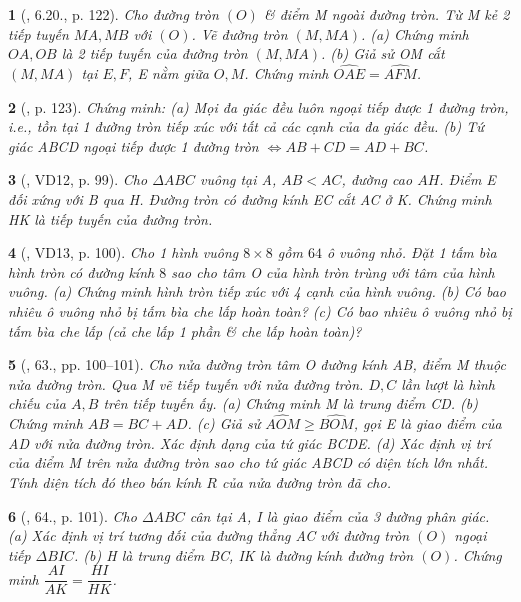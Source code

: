 \documentclass{article}
\newtheorem{baitoan}{}
\begin{document}
\begin{baitoan}[\cite{Binh_boi_duong_Toan_9_tap_1}, 6.20., p. 122]
	Cho đường tròn $(O)$ \& điểm M ngoài đường tròn. Từ M kẻ 2 tiếp tuyến $MA,MB$ với $(O)$. Vẽ đường tròn $(M,MA)$. (a) Chứng minh $OA,OB$ là 2 tiếp tuyến của đường tròn $(M,MA)$. (b) Giả sử OM cắt $(M,MA)$ tại $E,F$, E nằm giữa $O,M$. Chứng minh $\widehat{OAE} = \widehat{AFM}$.
\end{baitoan}

\begin{baitoan}[\cite{Binh_boi_duong_Toan_9_tap_1}, p. 123]
	Chứng minh: (a) Mọi đa giác đều luôn ngoại tiếp được 1 đường tròn, i.e., tồn tại 1 đường tròn tiếp xúc với tất cả các cạnh của đa giác đều. (b) Tứ giác ABCD ngoại tiếp được 1 đường tròn $\Leftrightarrow AB + CD = AD + BC$.
\end{baitoan}

\begin{baitoan}[\cite{Binh_Toan_9_tap_1}, VD12, p. 99]
	Cho $\Delta ABC$ vuông tại A, $AB < AC$, đường cao $AH$. Điểm E đối xứng với B qua H. Đường tròn có đường kính EC cắt AC ở K. Chứng minh HK là tiếp tuyến của đường tròn.
\end{baitoan}

\begin{baitoan}[\cite{Binh_Toan_9_tap_1}, VD13, p. 100]
	Cho 1 hình vuông $8\times8$ gồm $64$ ô vuông nhỏ. Đặt 1 tấm bìa hình tròn có đường kính $8$ sao cho tâm O của hình tròn trùng với tâm của hình vuông. (a) Chứng minh hình tròn tiếp xúc với 4 cạnh của hình vuông. (b) Có bao nhiêu ô vuông nhỏ bị tấm bìa che lấp hoàn toàn? (c) Có bao nhiêu ô vuông nhỏ bị tấm bìa che lấp (cả che lấp 1 phần \& che lấp hoàn toàn)?
\end{baitoan}

\begin{baitoan}[\cite{Binh_Toan_9_tap_1}, 63., pp. 100--101]
	Cho nửa đường tròn tâm O đường kính AB, điểm M thuộc nửa đường tròn. Qua M vẽ tiếp tuyến với nửa đường tròn. $D,C$ lần lượt là hình chiếu của $A,B$ trên tiếp tuyến ấy. (a) Chứng minh M là trung điểm CD. (b) Chứng minh $AB = BC + AD$. (c) Giả sử $ \widehat{AOM}\ge\widehat{BOM}$, gọi E là giao điểm của AD với nửa đường tròn. Xác định dạng của tứ giác BCDE. (d) Xác định vị trí của điểm M trên nửa đường tròn sao cho tứ giác ABCD có diện tích lớn nhất. Tính diện tích đó theo bán kính $R$ của nửa đường tròn đã cho.
\end{baitoan}

\begin{baitoan}[\cite{Binh_Toan_9_tap_1}, 64., p. 101]
	Cho $\Delta ABC$ cân tại A, I là giao điểm của 3 đường phân giác. (a) Xác định vị trí tương đối của đường thẳng AC với đường tròn $(O)$ ngoại tiếp $\Delta BIC$. (b) H là trung điểm BC, IK là đường kính đường tròn $(O)$. Chứng minh $\dfrac{AI}{AK} = \dfrac{HI}{HK}$.
\end{baitoan}
\end{document}

